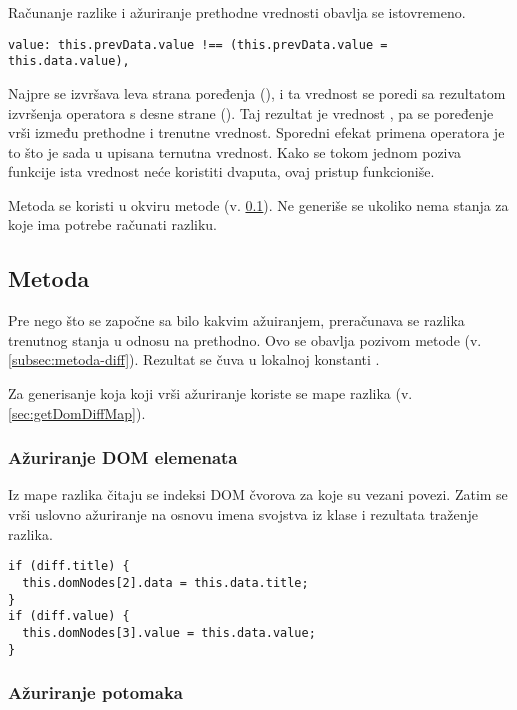 Računanje razlike i ažuriranje prethodne vrednosti obavlja se istovremeno.

\begin{lstlisting}
value: this.prevData.value !== (this.prevData.value = this.data.value),
\end{lstlisting}

Najpre se izvršava leva strana poređenja (), i ta vrednost se poredi sa rezultatom izvršenja operatora \code{=} s desne strane ().
Taj rezultat je vrednost , pa se poređenje vrši između prethodne i trenutne vrednost.
Sporedni efekat primena operatora \code{=} je to što je sada u  upisana ternutna vrednost.
Kako se tokom jednom poziva funkcije  ista vrednost neće koristiti dvaputa, ovaj pristup funkcioniše.

Metoda se koristi u okviru metode  (v. \cref{subsec:metoda-update}).
Ne generiše se ukoliko nema stanja za koje ima potrebe računati razliku.

\subsection{Metoda }
\label{subsec:metoda-update}

Pre nego što se započne sa bilo kakvim ažuiranjem, preračunava se razlika trenutnog stanja u odnosu na prethodno.
Ovo se obavlja pozivom metode  (v. \cref{subsec:metoda-diff}).
Rezultat se čuva u lokalnoj konstanti .

Za generisanje koja koji vrši ažuriranje koriste se mape razlika (v. \cref{sec:getDomDiffMap}).

\subsubsection{Ažuriranje DOM elemenata}

Iz mape razlika čitaju se indeksi DOM čvorova za koje su vezani povezi.
Zatim se vrši uslovno ažuriranje na osnovu imena svojstva iz klase i rezultata traženje razlika.

\begin{lstlisting}
if (diff.title) {
  this.domNodes[2].data = this.data.title;
}
if (diff.value) {
  this.domNodes[3].value = this.data.value;
}
\end{lstlisting}

\subsubsection{Ažuriranje potomaka}

